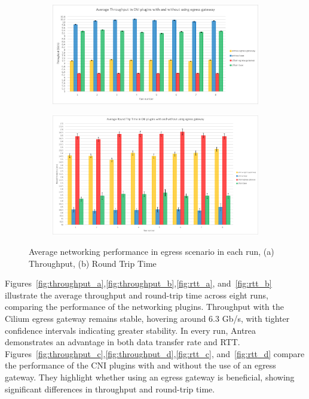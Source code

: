 \begin{figure}[H]
    \centering
    \begin{subfigure}[b]{0.9\textwidth}
        \includegraphics[width=\textwidth]{plots/egress/throughput_all.png}
        \caption{}
        \label{fig:throughput_all}
    \end{subfigure}
    \begin{subfigure}[b]{0.9\textwidth}
        \includegraphics[width=\textwidth]{plots/egress/rtt_all.png}
        \caption{}
        \label{fig:rtt_all}
    \end{subfigure}
    
    \caption{Average networking performance in egress scenario in each run, (a) Throughput, (b) Round Trip Time}
    \label{fig:networking_avg_all}
\end{figure}




Figures~\ref{fig:throughput_a},\ref{fig:throughput_b},\ref{fig:rtt_a}, and~\ref{fig:rtt_b} illustrate the average throughput and round-trip time across eight runs, comparing the performance of the networking plugins. Throughput with the Cilium egress gateway remains stable, hovering around 6.3 Gb/s, with tighter confidence intervals indicating greater stability. In every run, Antrea demonstrates an advantage in both data transfer rate and RTT.
Figures~\ref{fig:throughput_c},\ref{fig:throughput_d},\ref{fig:rtt_c}, and~\ref{fig:rtt_d} compare the performance of the CNI plugins with and without the use of an egress gateway. They highlight whether using an egress gateway is beneficial, showing significant differences in throughput and round-trip time.


